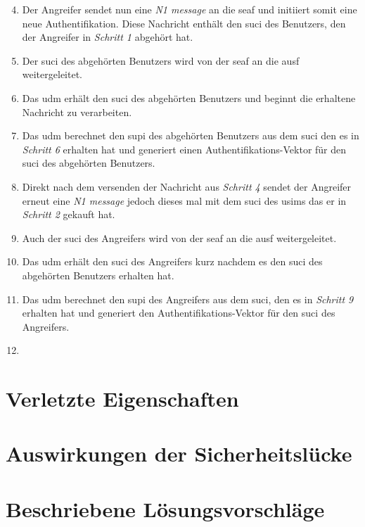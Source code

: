 \begin{enumerate}
\setcounter{enumi}{3}

\item Der Angreifer sendet nun eine \textit{N1 message} an die \gls{seaf} und initiiert somit eine neue Authentifikation.
Diese Nachricht enthält den \gls{suci} des Benutzers, den der Angreifer in \textit{Schritt 1} abgehört hat.

\item Der \gls{suci} des abgehörten Benutzers wird von der \gls{seaf} an die \gls{ausf} weitergeleitet.

\item Das \gls{udm} erhält den \gls{suci} des abgehörten Benutzers und beginnt die erhaltene Nachricht zu verarbeiten.

\item Das \gls{udm} berechnet den \gls{supi} des abgehörten Benutzers aus dem \gls{suci} den es in \textit{Schritt 6} erhalten hat und generiert einen Authentifikations-Vektor für den \gls{suci} des abgehörten Benutzers.

\item Direkt nach dem versenden der Nachricht aus \textit{Schritt 4} sendet der Angreifer erneut eine \textit{N1 message} jedoch dieses mal mit dem \gls{suci} des \gls{usim}s das er in \textit{Schritt 2} gekauft hat.

\item Auch der \gls{suci} des Angreifers wird von der \gls{seaf} an die \gls{ausf} weitergeleitet.

\item Das \gls{udm} erhält den \gls{suci} des Angreifers kurz nachdem es den \gls{suci} des abgehörten Benutzers erhalten hat.

\item Das \gls{udm} berechnet den \gls{supi} des Angreifers aus dem \gls{suci}, den es in \textit{Schritt 9} erhalten hat und generiert den Authentifikations-Vektor  für den \gls{suci} des Angreifers.

\item 

\end{enumerate}


\section{Verletzte Eigenschaften}

\section{Auswirkungen der Sicherheitslücke}

\section{Beschriebene Lösungsvorschläge}
